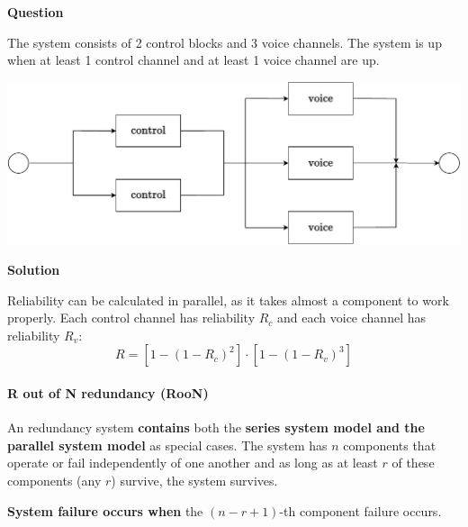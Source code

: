 \begin{examplebox}
    \begin{flushleft}
        \textcolor{Green3}{ \textbf{Question}}
    \end{flushleft}
    The system consists of 2 control blocks and 3 voice channels. The system is up when at least 1 control channel and at least 1 voice channel are up.
    \begin{center}
        \includegraphics[width=\textwidth]{img/RBD-6.pdf}
    \end{center}
    \begin{flushleft}
        \textcolor{Green3}{ \textbf{Solution}}
    \end{flushleft}
    Reliability can be calculated in parallel, as it takes almost a component to work properly. Each control channel has reliability $R_{c}$ and each voice channel has reliability $R_{v}$:
    \begin{equation*}
        R = \left[1 - \left(1 - R_{c}\right)^{2}\right] \cdot \left[1 - \left(1 - R_{v}\right)^{3}\right]
    \end{equation*}
\end{examplebox}

\newpage

\paragraph{R out of N redundancy (RooN)}

An  redundancy system \textbf{contains} both the \textbf{series system model and the parallel system model} as special cases. The system has $n$ components that operate or fail independently of one another and as long as at least $r$ of these components (any $r$) survive, the system survives.\cite{nist8184Model}

\highspace
\textbf{System failure occurs when} the $\left(n - r + 1\right)$-th component failure occurs.\cite{nist8184Model}

